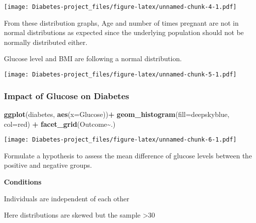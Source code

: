 \documentclass[
]{article}
\newenvironment{Shaded}{\begin{snugshade}}{\end{snugshade}}
\newcommand{\AttributeTok}[1]{\textcolor[rgb]{0.13,0.29,0.53}{#1}}
\newcommand{\FunctionTok}[1]{\textcolor[rgb]{0.13,0.29,0.53}{\textbf{#1}}}
\newcommand{\NormalTok}[1]{#1}
\newcommand{\SpecialCharTok}[1]{\textcolor[rgb]{0.81,0.36,0.00}{\textbf{#1}}}
\newcommand{\StringTok}[1]{\textcolor[rgb]{0.31,0.60,0.02}{#1}}
\begin{document}
\texttt{[image: Diabetes-project\_files/figure-latex/unnamed-chunk-4-1.pdf]}

From these distribution graphs, Age and number of times pregnant are not
in normal distributions as expected since the underlying population
should not be normally distributed either.

Glucose level and BMI are following a normal distribution.

\begin{Shaded}
\end{Shaded}

\texttt{[image: Diabetes-project\_files/figure-latex/unnamed-chunk-5-1.pdf]}

\hypertarget{impact-of-glucose-on-diabetes}{%
\subsubsection{\texorpdfstring{\textbf{Impact of Glucose on
Diabetes}}{Impact of Glucose on Diabetes}}\label{impact-of-glucose-on-diabetes}}

\begin{Shaded}
\begin{Highlighting}[]
\FunctionTok{ggplot}\NormalTok{(diabetes, }\FunctionTok{aes}\NormalTok{(}\AttributeTok{x=}\NormalTok{Glucose))}\SpecialCharTok{+}
     \FunctionTok{geom\_histogram}\NormalTok{(}\AttributeTok{fill=}\StringTok{\textquotesingle{}deepskyblue\textquotesingle{}}\NormalTok{, }\AttributeTok{col=}\StringTok{\textquotesingle{}red\textquotesingle{}}\NormalTok{) }\SpecialCharTok{+}
      \FunctionTok{facet\_grid}\NormalTok{(Outcome}\SpecialCharTok{\textasciitilde{}}\NormalTok{.)}
\end{Highlighting}
\end{Shaded}

\texttt{[image: Diabetes-project\_files/figure-latex/unnamed-chunk-6-1.pdf]}

Formulate a hypothesis to assess the mean difference of glucose levels
between the positive and negative groups.

\textbf{Conditions}

Individuals are independent of each other

Here distributions are skewed but the sample \textgreater30
\end{document}

